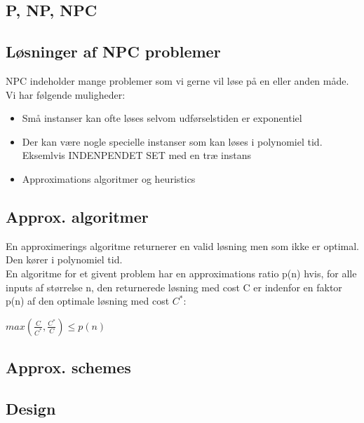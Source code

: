 \documentclass{article}
\begin{document}
\subsection{P, NP, NPC}
\subsection{Løsninger af NPC problemer}
NPC indeholder mange problemer som vi gerne vil løse på en eller anden måde. Vi har følgende muligheder:
\begin{itemize}
	\item Små instanser kan ofte løses selvom udførselstiden er exponentiel
	\item Der kan være nogle specielle instanser som kan løses i polynomiel tid. Eksemlvis INDENPENDET SET med en træ instans
	\item Approximations algoritmer og heuristics
\end{itemize}
\subsection{Approx. algoritmer}
En approximerings algoritme returnerer en valid løsning men som ikke er optimal. Den kører i polynomiel tid.\\

En algoritme for et givent problem har en approximations ratio p(n) hvis, for alle inputs af størrelse n,  den returnerede løsning med cost C er indenfor en faktor p(n) af den optimale løsning med cost $C^*$:
\begin{center}
$max(\frac{C}{C^*},\frac{C^*}{C})\le p(n)$
\end{center}
\subsection{Approx. schemes}
\subsection{Design}
\end{document}
